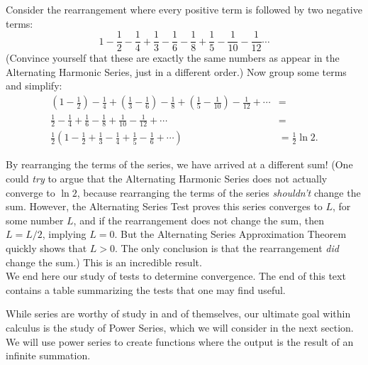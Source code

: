 Consider the rearrangement where every positive term is followed by two negative terms:
$$
1-\frac12-\frac14+\frac13-\frac16-\frac18+\frac15-\frac1{10}-\frac1{12}\cdots
$$
(Convince yourself that these are exactly the same numbers as appear in the Alternating Harmonic Series, just in a different order.) Now group some terms and simplify:
\begin{align*}
\left(1-\frac12\right)-\frac14+\left(\frac13-\frac16\right)-\frac18+\left(\frac15-\frac1{10}\right)-\frac1{12}+\cdots &= \\
\frac12-\frac14+\frac16-\frac18+\frac1{10}-\frac{1}{12}+\cdots &= \\
\frac12\left(1-\frac12+\frac13-\frac14+\frac15-\frac16+\cdots\right) & = \frac12\ln 2.
\end{align*}

By rearranging the terms of the series, we have arrived at a different sum! (One could \textit{try} to argue that the Alternating Harmonic Series does not actually converge to $\ln 2$, because rearranging the terms of the series \emph{shouldn't} change the sum. However, the Alternating Series Test proves this series converges to $L$, for some number $L$, and if the rearrangement does not change the sum, then $L = L/2$, implying $L=0$. But the Alternating Series Approximation Theorem quickly shows that $L>0$. The only conclusion is that the rearrangement \emph{did} change the sum.) This is an incredible result.\\

We end here our study of tests to determine convergence. The end of this text contains a table summarizing the tests that one may find useful. 

While series are worthy of study in and of themselves, our ultimate goal within calculus is the study of Power Series, which we will consider in the next section. We will use power series to create functions where the output is the result of an infinite summation. %

